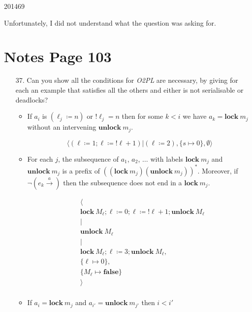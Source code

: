 \documentclass[10pt,\jkfside,a4paper]{article}
\begin{document}
\begin{examquestion}{2014}{6}{9}
\begin{enumerate}
Unfortunately, I did not understand what the question was asking for.

\end{enumerate}

\end{examquestion}

\section{Notes Page 103}

\begin{enumerate}

\item[37.] Can you show all the conditions for \textit{O2PL} are necessary,
by giving for each an example that satisfies all the others and either is not
serialisable or deadlocks?

\begin{itemize}

\item If $a_i$ is $(\ell_j \coloneqq n)$ or $!\ell_j = n$ then for some $k <
i$ we have $a_k = \mathbf{lock} \ m_j$ without an intervening
$\mathbf{unlock} \ m_j$.

\[
\langle (\ell \coloneqq 1; \ell \coloneqq !\ell + 1)|(\ell \coloneqq 2), \{s
\mapsto 0\}, \emptyset \rangle
\]

\item For each $j$, the subsequence of $a_1$, $a_2$, $\dots$ with labels
$\mathbf{lock} \ m_j$ and $\mathbf{unlock} \ m_j$ is a prefix of
$((\mathbf{lock} \ m_j)(\mathbf{unlock} \ m_j))^*$. Moreover, if
$\neg(e_k \stackrel{a}{\longrightarrow})$ then the subsequence does not end
in a $\mathbf{lock} \ m_j$.

\[
\begin{split}
&\langle \\
&\mathbf{lock} \ M_{\ell}; \ell \coloneqq 0; \ell \coloneqq !\ell + 1;
\mathbf{unlock} \ M_\ell \\
&| \\
&\mathbf{unlock} \ M_{\ell} \\
&| \\
&\mathbf{lock} \ M_{\ell}; \ell \coloneqq 3; \mathbf{unlock} \ M_\ell, \\
&\{\ell \mapsto 0\}, \\
&\{M_\ell \mapsto \mathbf{false}\} \\
&\rangle \\
\end{split}
\]

\item If $a_i = \mathbf{lock} \ m_j$ and $a_{i'} = \mathbf{unlock} \ m_{j'}$
then $i < i'$


\end{itemize}
\end{enumerate}
\end{document}
